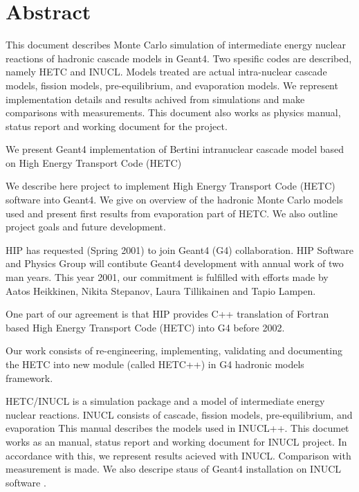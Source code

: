 \section{Abstract}

This document describes Monte Carlo simulation of intermediate energy nuclear reactions of hadronic cascade models in {\sc Geant4}.
Two spesific codes are described, namely HETC and INUCL. 
Models treated are actual intra-nuclear cascade models, fission models, pre-equilibrium, and evaporation models.
We represent implementation details and results achived from simulations and make comparisons with measurements.
This document also works as physics manual, status report and working document for the project.


We present Geant4 implementation of Bertini intranuclear cascade model based on High Energy Transport Code (HETC)

We describe here project to implement High Energy Transport Code (HETC) software into Geant4. 
We give on overview of the hadronic Monte Carlo models used and present first results from evaporation part of HETC. 
We also outline project goals and future development.

HIP has requested (Spring 2001) to join Geant4 (G4) collaboration. 
HIP Software and Physics Group will contibute Geant4 development with annual work of two man years. 
This year 2001, our commitment is fulfilled with efforts made by Aatos
Heikkinen, Nikita Stepanov, Laura Tillikainen and Tapio Lampen.

One part of our agreement is that HIP provides C++ translation of Fortran based High Energy Transport Code (HETC) into G4 before 2002.

Our work consists of re-engineering, implementing, validating and documenting the HETC into new module (called HETC++) in G4 hadronic models framework.



HETC/INUCL is a simulation package and a model of intermediate energy nuclear
reactions.
INUCL consists of cascade, fission models, pre-equilibrium, and evaporation
This manual describes the models used in INUCL++. 
This documet works as an manual, status report and working document for INUCL project. In accordance with this, we represent results acieved with INUCL. Comparison with measurement is made. 
We also descripe staus of Geant4 installation on INUCL software \cite{titarenko99a}.

